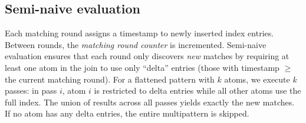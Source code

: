 



\subsection{Semi-naive evaluation}
\label{sec:seminaive}

Each matching round assigns a timestamp to newly inserted index entries. Between
rounds, the \emph{matching round counter} is incremented. Semi-naive evaluation
ensures that each round only discovers \emph{new} matches by requiring at least
one atom in the join to use only ``delta'' entries (those with timestamp
$\geq$ the current matching round). For a flattened pattern with $k$ atoms, we
execute $k$ passes: in pass $i$, atom $i$ is restricted to delta entries while
all other atoms use the full index. The union of results across all passes yields
exactly the new matches. If no atom has any delta entries, the entire
multipattern is skipped.


